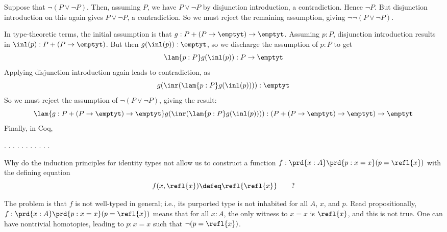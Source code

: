 \soln  
Suppose that $\lnot(P \lor \lnot P)$.  Then, assuming $P$, we have
$P \lor \lnot P$ by disjunction introduction, a contradiction.  Hence
$\lnot P$.  But disjunction introduction on this again gives $P \lor \lnot P$,
a contradiction.  So we must reject the remaining assumption, giving
$\lnot\lnot(P \lor \lnot P)$.


In type-theoretic terms, the initial assumption is that $g : P + (P \to
\emptyt) \to \emptyt$.  Assuming $p : P$, disjunction introduction results in
$\inl(p) : P + (P \to \emptyt)$.  But then $g(\inl(p)) : \emptyt$, so we
discharge the assumption of $p : P$ to get
\[
  \lam{p:P}g(\inl(p)) : P \to \emptyt
\]
Applying disjunction introduction again leads to contradiction, as
\[
  g(\inr(\lam{p:P}g(\inl(p)))) : \emptyt
\]
So we must reject the assumption of $\lnot( P \lor \lnot P)$, giving the
result:
\[
  \lam{g:P + (P \to \emptyt) \to \emptyt}g(\inr(\lam{p:P}g(\inl(p)))) 
  : 
  (P + (P \to \emptyt) \to \emptyt) \to \emptyt
\]
Finally, in Coq, \begin{coqdoccode}
\coqdocemptyline
\coqdocnoindent
{} \coqdocnotation{\ensuremath{\lnot}} \coqdocnotation{\ensuremath{\lnot}} \coqdocnotation{(}  \coqdocnotation{\ensuremath{\lnot}}\coqdocnotation{)}.\coqdoceol
\coqdocnoindent
{}.\coqdoceol
\coqdocindent{1.00em}
 .\coqdoceol
\coqdocindent{1.00em}
 .\coqdoceol
\coqdocindent{1.00em}
 .\coqdoceol
\coqdocindent{1.00em}
.\coqdoceol
\coqdocindent{1.00em}
 .\coqdoceol
\coqdocindent{1.00em}
 .\coqdoceol
\coqdocindent{1.00em}
.\coqdoceol
\coqdocindent{1.00em}
 .\coqdoceol
\coqdocnoindent
{}.\coqdoceol
\coqdocemptyline
\coqdocemptyline
\end{coqdoccode}


Why do the induction principles for identity types not allow
us to construct a function $f : \prd{x:A}\prd{p:x=x}(p = \refl{x})$ with the
defining equation
\[
  f(x, \refl{x}) \defeq \refl{\refl{x}}\qquad?
\] 

 \soln
The problem is that $f$ is not well-typed in general; i.e., its purported type
is not inhabited for all $A$, $x$, and $p$.  Read propositionally, $f :
\prd{x:A}\prd{p:x=x}(p = \refl{x})$ means that for all $x:A$, the only witness
to $x = x$ is $\refl{x}$, and this is not true.  One can have nontrivial
homotopies, leading to $p : x = x$ such that $\lnot (p = \refl{x})$.


